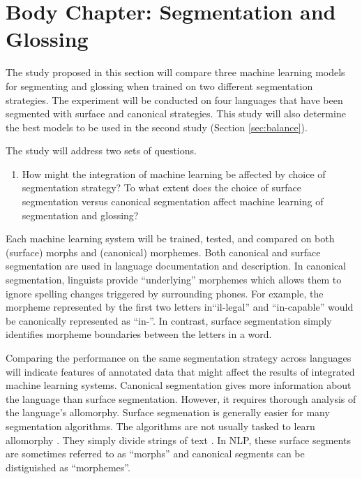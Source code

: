 \section{Body Chapter: Segmentation and Glossing}
\label{sec:seggls}

The study proposed in this section will compare three machine learning models for segmenting and glossing when trained on two different segmentation strategies. The experiment will be conducted on four languages that have been segmented with surface and canonical strategies. 
This study will also determine the best models to be used in the second study (Section \ref{sec:balance}). 

The study will address two sets of questions.

\begin{enumerate}
    \item How might the integration of machine learning be affected by choice of segmentation strategy? To what extent does the choice of surface segmentation versus canonical segmentation affect machine learning of segmentation and glossing?
\end{enumerate}

Each machine learning system will be trained, tested, and compared on both (surface) morphs and (canonical) morphemes. Both canonical and surface segmentation are used in language documentation and description. In canonical segmentation, linguists provide ``underlying'' morphemes which allows them to ignore spelling changes triggered by surrounding phones. For example, the morpheme represented by the first two letters in``il-legal'' and ``in-capable'' would be canonically represented as ``in-''. In contrast, surface segmentation simply identifies morpheme boundaries between the letters in a word. 

Comparing the performance on the same segmentation strategy across languages will indicate features of annotated data that might affect the results of integrated machine learning systems. Canonical segmentation gives more information about the language than surface segmentation. However, it requires thorough analysis of the language's allomorphy. 
Surface segmenation is generally easier for many segmentation algorithms. The algorithms are not usually tasked to learn allomorphy \cite{goldsmith_computational_2017}. They simply divide strings of text \cite{virpioja_empirical_2011}. In NLP, these surface segments are sometimes referred to as ``morphs'' and canonical segments can be distiguished as ``morphemes''. 

